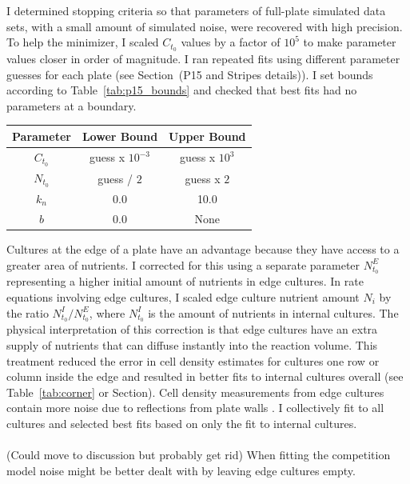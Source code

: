 I determined stopping criteria so that parameters of full-plate
simulated data sets, with a small amount of simulated noise, were
recovered with high precision. To help the minimizer, I scaled
\(C_{t_{0}}\) values by a factor of \(10^{5}\) to make parameter
values closer in order of magnitude. I ran repeated fits using
different parameter guesses for each plate (see Section~(P15 and
Stripes details)). I set bounds according to
Table~\ref{tab:p15_bounds} and checked that best fits had no
parameters at a boundary.
%
\columnbreak
\begin{center}
  \begin{tabular}{| c | c c |}
    \hline
    Parameter        & Lower Bound  & Upper Bound \\
    \hline
    \(C_{t_{0}}\)     & guess x \(10^{-3}\)  & guess x \(10^{3}\)\\
    \(N_{t_{0}}\)     & guess / \(2\)  & guess x \(2\)\\
    \(k_{n}\)        & 0.0    & 10.0\\
    \(b\)           & 0.0    & None \\
    \hline
  \end{tabular}
  \label{tab:p15_bounds}
\end{center}
%
Cultures at the edge of a plate have an advantage because they have
access to a greater area of nutrients. I corrected for this using a
separate parameter \(N^{E}_{t_{0}}\) representing a higher initial
amount of nutrients in edge cultures. In rate equations involving edge
cultures, I scaled edge culture nutrient amount \(N_{i}\) by the ratio
\(N^{I}_{t_{0}}/N^{E}_{t_{0}}\), where \(N^{I}_{t_{0}}\) is the amount
of nutrients in internal cultures. The physical interpretation of this
correction is that edge cultures have an extra supply of nutrients
that can diffuse instantly into the reaction volume. This treatment
reduced the error in cell density estimates for cultures one row or
column inside the edge and resulted in better fits to internal
cultures overall (see Table~\ref{tab:corner} or Section). Cell density
measurements from edge cultures contain more noise due to reflections
from plate walls \citep{Lawless2010}. I collectively fit to all
cultures and selected best fits based on only the fit to internal
cultures.
\\\\
(Could move to discussion but probably get rid) When fitting the
competition model noise might be better dealt with by leaving edge
cultures empty.
\\

